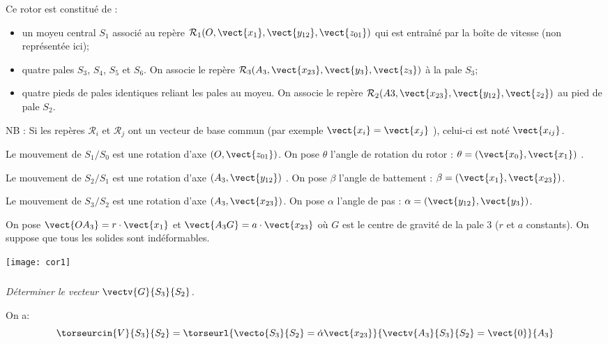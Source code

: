 \begin{multicols}{2}
Ce rotor est constitué de :
\begin{itemize}
\item un moyeu central $S_1$ associé au repère $\mathcal{R}_1(O,\vect{x_1},\vect{y_{12}},\vect{z_{01}})$ qui est entraîné par la boîte de vitesse (non
représentée ici);
\item quatre pales $S_3$, $S_4$, $S_5$ et $S_6$. On associe le repère $\mathcal{R}_3(A_3,\vect{x_{23}},\vect{y_3},\vect{z_3} )$ à la pale $S_3$;
\item quatre pieds de pales identiques reliant les pales au moyeu. On associe le repère
$\mathcal{R}_2(A3,\vect{x_{23}},\vect{y_{12}},\vect{z_2} )$ au pied de pale $S_2$.
\end{itemize}

NB : Si les repères $\mathcal{R}_i$ et $\mathcal{R}_j$ ont un vecteur de base commun (par exemple $\vect{x_i}= \vect{x_j}$ ), celui-ci est noté $\vect{x_{ij}}$.


Le mouvement de $S_1/S_0$ est une rotation d'axe $(O,\vect{z_{01}})$. On pose $\theta$ l’angle de rotation du rotor : $\theta = (\vect{x_0},\vect{x_1})$ .

Le mouvement de $S_2/S_1$ est une rotation d'axe $(A_3,\vect{y_{12}})$ . On pose $\beta$ l’angle de battement : $\beta = (\vect{x_1},\vect{x_{23}})$.

Le mouvement de $S_3/S_2$ est une rotation d'axe $(A_3,\vect{x_{23}})$. On pose $\alpha$ l’angle de pas : $\alpha = (\vect{y_{12}},\vect{y_3})$.

On pose $\vect{OA_3} = r\cdot \vect{x_1}$ et $\vect{A_3G}=a\cdot \vect{x_{23}}$ où $G$ est le centre de gravité de la pale 3 ($r$ et $a$ constants). On suppose que tous les solides sont indéformables.


\begin{center}
\texttt{[image: cor1]}
\end{center}

\fi

\subparagraph{}
\textit{Déterminer le vecteur $\vectv{G}{S_3}{S_2}$.}
\ifprof
\begin{corrige}
On a: 
$$
\torseurcin{V}{S_3}{S_2} = \torseurl{\vecto{S_3}{S_2}=\dot{\alpha}\vect{x_{23}}}{\vectv{A_3}{S_3}{S_2}=\vect{0}}{A_3}
$$


\end{corrige}
\end{multicols}
